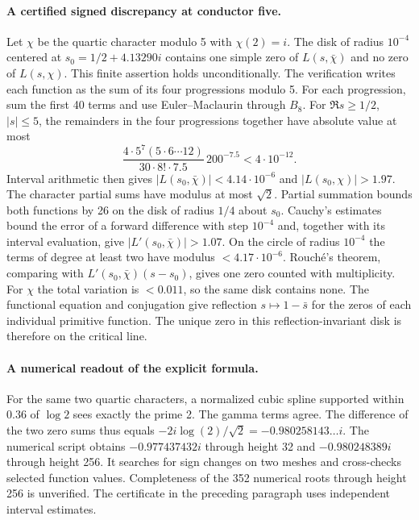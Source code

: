 \documentclass[11pt,letterpaper]{article}
\begin{document}
\paragraph{A certified signed discrepancy at conductor five.}
Let $\chi$ be the quartic character modulo 5 with $\chi(2)=i$. The disk of radius $10^{-4}$ centered at $s_0=1/2+4.13290i$ contains one simple zero of $L(s,\bar\chi)$ and no zero of $L(s,\chi)$. This finite assertion holds unconditionally. The verification writes each function as the sum of its four progressions modulo 5. For each progression, sum the first 40 terms and use Euler--Maclaurin through $B_8$. For $\Re s\ge1/2$, $|s|\le5$, the remainders in the four progressions together have absolute value at most
\[
 \frac{4\cdot 5^7 (5\cdot6\cdots12)}{30\cdot 8!\cdot 7.5}\,200^{-7.5}<4\cdot10^{-12}.
\]
Interval arithmetic then gives $|L(s_0,\bar\chi)|<4.14\cdot10^{-6}$ and $|L(s_0,\chi)|>1.97$. The character partial sums have modulus at most $\sqrt2$. Partial summation bounds both functions by 26 on the disk of radius $1/4$ about $s_0$. Cauchy's estimates bound the error of a forward difference with step $10^{-4}$ and, together with its interval evaluation, give $|L'(s_0,\bar\chi)|>1.07$. On the circle of radius $10^{-4}$ the terms of degree at least two have modulus $<4.17\cdot10^{-6}$. Rouch\'e's theorem, comparing with $L'(s_0,\bar\chi)(s-s_0)$, gives one zero counted with multiplicity. For $\chi$ the total variation is $<0.011$, so the same disk contains none. The functional equation and conjugation give reflection $s\mapsto 1-\bar s$ for the zeros of each individual primitive function. The unique zero in this reflection-invariant disk is therefore on the critical line.

\paragraph{A numerical readout of the explicit formula.}
For the same two quartic characters, a normalized cubic spline supported within $0.36$ of $\log 2$ sees exactly the prime 2. The gamma terms agree. The difference of the two zero sums thus equals $-2i\log(2)/\sqrt2=-0.980258143\ldots i$. The numerical script obtains $-0.977437432i$ through height 32 and $-0.980248389i$ through height 256. It searches for sign changes on two meshes and cross-checks selected function values. Completeness of the 352 numerical roots through height 256 is unverified. The certificate in the preceding paragraph uses independent interval estimates.
\end{document}
